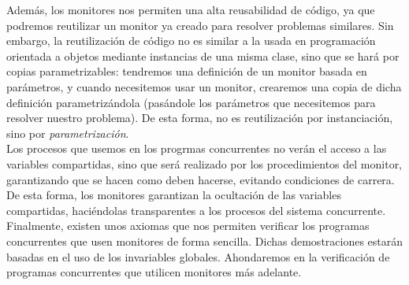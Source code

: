 Además, los monitores nos permiten una alta reusabilidad de código, ya que podremos reutilizar un monitor ya creado para resolver problemas similares. Sin embargo, la reutilización de código no es similar a la usada en programación orientada a objetos mediante instancias de una misma clase, sino que se hará por copias parametrizables: tendremos una definición de un monitor basada en parámetros, y cuando necesitemos usar un monitor, crearemos una copia de dicha definición parametrizándola (pasándole los parámetros que necesitemos para resolver nuestro problema). De esta forma, no es reutilización por instanciación, sino por \textit{parametrización}.\\

Los procesos que usemos en los progrmas concurrentes no verán el acceso a las variables compartidas, sino que será realizado por los procedimientos del monitor, garantizando que se hacen como deben hacerse, evitando condiciones de carrera. De esta forma, los monitores garantizan la ocultación de las variables compartidas, haciéndolas transparentes a los procesos del sistema concurrente.\\

Finalmente, existen unos axiomas que nos permiten verificar los programas concurrentes que usen monitores de forma sencilla. Dichas demostraciones estarán basadas en el uso de los invariables globales. Ahondaremos en la verificación de programas concurrentes que utilicen monitores más adelante.

